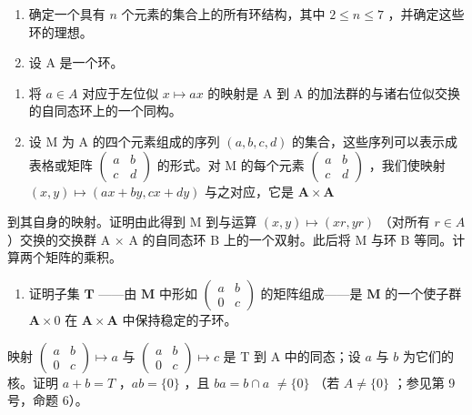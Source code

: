 \BourbakiExercisesSection

\begin{enumerate}
\def\labelenumi{\arabic{enumi}.}
\item
  确定一个具有 \(n\) 个元素的集合上的所有环结构，其中 \(2 \leqslant n \leqslant 7\) ，并确定这些环的理想。
\item
  设 A 是一个环。
\end{enumerate}

\begin{enumerate}
\def\labelenumi{(\alph{enumi})}
\item
  将 \(a \in A\) 对应于左位似 \(x \mapsto ax\) 的映射是 A 到 A 的加法群的与诸右位似交换的自同态环上的一个同构。
\item
  设 M 为 A 的四个元素组成的序列 \((a, b, c, d)\) 的集合，这些序列可以表示成表格或矩阵 \(\begin{pmatrix} a & b \\ c & d \end{pmatrix}\) 的形式。对 M 的每个元素 \(\begin{pmatrix} a & b \\ c & d \end{pmatrix}\) ，我们使映射 \((x, y) \mapsto (ax + by, cx + dy)\) 与之对应，它是 \(\mathbf{A} \times \mathbf{A}\)
\end{enumerate}

到其自身的映射。证明由此得到 M 到与运算 \((x, y) \mapsto (xr, yr)\) （对所有 \(r \in A\)）交换的交换群 A × A 的自同态环 B 上的一个双射。此后将 M 与环 B 等同。计算两个矩阵的乘积。

\begin{enumerate}
\def\labelenumi{(\alph{enumi})}
\setcounter{enumi}{2}
\tightlist
\item
  证明子集 \(\mathbf{T}\) ——由 \(\mathbf{M}\) 中形如 \(\begin{pmatrix} a & b \\ 0 & c \end{pmatrix}\) 的矩阵组成——是 \(\mathbf{M}\) 的一个使子群 \(\mathbf{A} \times 0\) 在 \(\mathbf{A} \times \mathbf{A}\) 中保持稳定的子环。
\end{enumerate}

映射 \(\begin{pmatrix} a & b \\ 0 & c \end{pmatrix} \mapsto a\) 与 \(\begin{pmatrix} a & b \\ 0 & c \end{pmatrix} \mapsto c\) 是 T 到 A 中的同态；设 \(a\) 与 \(b\) 为它们的核。证明 \(a + b = T\) ，\(ab = \{0\}\) ，且 \(ba = b \cap a\) \(\neq \{0\}\) （若 \(A \neq \{0\}\) ；参见第 9 号，命题 6）。

